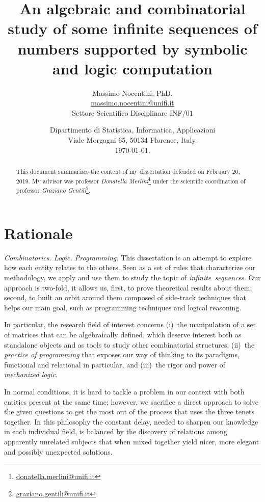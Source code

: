 \documentclass[a4paper, 10pt]{article}
\begin{document}
\title{An algebraic and combinatorial study of some infinite sequences of
	numbers supported by symbolic and logic computation}
\author{Massimo Nocentini, PhD.\\{\small\url{massimo.nocentini@unifi.it}}\\
	{\footnotesize{Settore Scientifico Disciplinare INF/$01$ }}}
\date{\small Dipartimento di
Statistica, Informatica, Applicazioni\\Viale Morgagni 65, 50134 Florence,
Italy.\\\today.}

\maketitle

\begin{abstract}
This document summarizes the content of my dissertation defended on February
	20, 2019. My advisor was professor \textit{Donatella Merlini}\footnote{\url{donatella.merlini@unifi.it}} 
	under the scientific coordination of professor \textit{Graziano Gentili}\footnote{\url{graziano.gentili@unifi.it}}.
\end{abstract}

\section*{Rationale}

\textit{Combinatorics. Logic. Programming.} This dissertation is an attempt to
explore how each entity relates to the others. Seen as a set of rules that
characterize our methodology, we apply and use them to study the topic of
\textit{infinite~sequences}.  Our approach is two-fold, it allows us, first, to
prove theoretical results about them; second, to built an orbit around them
composed of side-track techniques that helps our main goal, such as programming
techniques and logical reasoning.

In particular, the research field of interest concerns (i)~the manipulation of
a set of matrices that can be algebraically defined, which deserve interest
both as standalone objects and as tools to study other combinatorial
structures; (ii)~the \textit{practice of programming} that exposes our way of
thinking to its paradigms, functional and relational in particular, and
(iii)~the rigor and power of \textit{mechanized logic}.

In normal conditions, it is hard to tackle a problem in our context with both
entities present at the same time; however, we sacrifice a direct approach to
solve the given questions to get the most out of the process that uses the
three tenets together. In this philosophy the constant delay, needed to sharpen
our knowledge in each individual field, is balanced by the discovery of
relations among apparently unrelated subjects that when mixed together yield
nicer, more elegant and possibly unexpected solutions.
\end{document}
